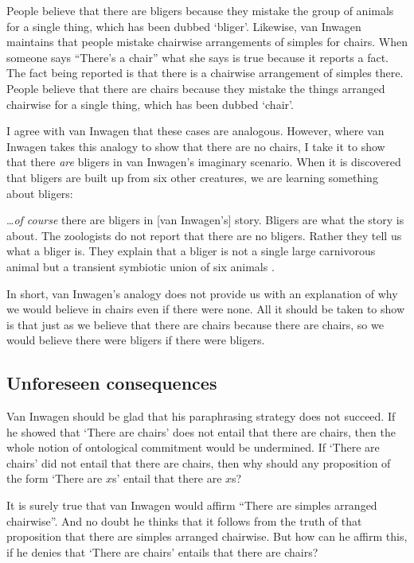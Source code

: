 \documentclass[12pt,twoside]{reedfancy}
\newenvironment{squote}{%
	\begin{spacing}{1}
	\begin{list}{}{%
	\setlength{\labelwidth}{0pt}%
	\rightmargin\leftmargin%
	}
	\item\relax
	}{%
	\end{list}%
	\end{spacing}
	}
\begin{document}
\begin{spacing}{1.25}
People believe that there are bligers because they mistake the group
of animals for a single thing, which has been dubbed `bliger'.
Likewise, van Inwagen maintains that people mistake chairwise
arrangements of simples for chairs.  When someone says ``There's a
chair'' what she says is true because it reports a fact.  The fact
being reported is that there is a chairwise arrangement of simples
there.  People believe that there are chairs because they mistake the
things arranged chairwise for a single thing, which has been dubbed
`chair'.

I agree with van Inwagen that these cases are analogous.  However,
where van Inwagen takes this analogy to show that there are no chairs,
I take it to show that there {\em are} bligers in van Inwagen's
imaginary scenario.  When it is discovered that bligers are built up
from six other creatures, we are learning something about bligers:

\begin{squote}
\ldots {\em of course} there are bligers in [van Inwagen's] story.
Bligers are what the story is about.  The zoologists do not report
that there are no bligers.  Rather they tell us what a bliger is.
They explain that a bliger is not a single large carnivorous animal
but a transient symbiotic union of six animals
\citep[704]{rosenberg1993}.
\end{squote}

In short, van Inwagen's analogy does not provide us with an
explanation of why we would believe in chairs even if there were
none.  All it should be taken to show is that just as we believe that
there are chairs because there are chairs, so we would believe there
were bligers if there were bligers.

\subsection{Unforeseen consequences}
\label{backfire}
Van Inwagen should be glad that his paraphrasing strategy does not
succeed.  If he showed that `There are chairs' does not entail that
there are chairs, then the whole notion of ontological commitment
would be undermined.  If `There are chairs' did not entail that there
are chairs, then why should any proposition of the form `There are
$x$s' entail that there are $x$s?

It is surely true that van Inwagen would affirm ``There are simples
arranged chairwise''.  And no doubt he thinks that it follows from the
truth of that proposition that there are simples arranged chairwise.
But how can he affirm this, if he denies that `There are chairs'
entails that there are chairs?


\end{spacing}
\end{document}
